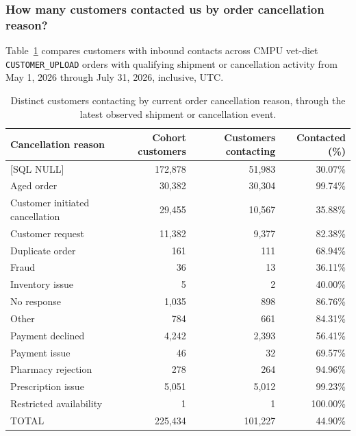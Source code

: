 \clearpage
\subsubsection{How many customers contacted us by order cancellation reason?}
Table~\ref{tab:customer-contacts-by-cancellation-reason} compares customers with
inbound contacts across CMPU vet-diet \texttt{CUSTOMER\_UPLOAD} orders with
qualifying shipment or cancellation activity from May 1, 2026 through July 31, 2026, inclusive, UTC.

\begin{table}[!htbp]
\centering
\caption{Distinct customers contacting by current order cancellation reason, through the latest observed shipment or cancellation event.}
\label{tab:customer-contacts-by-cancellation-reason}
\small
\begin{tabular}{@{}lrrr@{}}
\toprule
Cancellation reason & Cohort customers & Customers contacting & Contacted (\%) \\
\midrule
{[SQL NULL]} & 172,878 & 51,983 & 30.07\% \\
\rowcolor{yellow!35}
{Aged order} & 30,382 & 30,304 & 99.74\% \\
{Customer initiated cancellation} & 29,455 & 10,567 & 35.88\% \\
{Customer request} & 11,382 & 9,377 & 82.38\% \\
{Duplicate order} & 161 & 111 & 68.94\% \\
{Fraud} & 36 & 13 & 36.11\% \\
{Inventory issue} & 5 & 2 & 40.00\% \\
{No response} & 1,035 & 898 & 86.76\% \\
{Other} & 784 & 661 & 84.31\% \\
{Payment declined} & 4,242 & 2,393 & 56.41\% \\
{Payment issue} & 46 & 32 & 69.57\% \\
{Pharmacy rejection} & 278 & 264 & 94.96\% \\
{Prescription issue} & 5,051 & 5,012 & 99.23\% \\
{Restricted availability} & 1 & 1 & 100.00\% \\
\midrule
{TOTAL} & 225,434 & 101,227 & 44.90\% \\
\bottomrule
\end{tabular}


\end{table}
